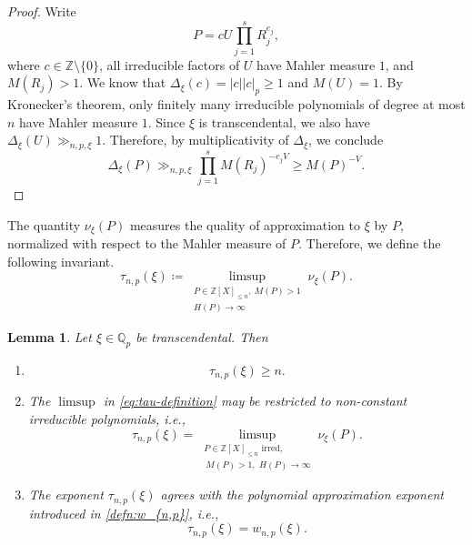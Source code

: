 \documentclass[10pt,a4paper]{amsart}
\newtheorem{lemma}[theorem]{Lemma}
\newcommand{\Z}{\mathbb Z}
\newcommand{\Qp}{\mathbb Q_p}
\begin{document}
\begin{proof}
Write
$$
P=cU\prod_{j=1}^sR_j^{e_j},
$$
where $c\in\Z\setminus\{0\}$, all irreducible factors of $U$ have Mahler
measure $1$, and $M(R_j)>1$. We know that $\Delta_\xi(c)=|c||c|_p\geq1$ and $M(U)=1$. By Kronecker's theorem, only finitely many irreducible polynomials of degree at most $n$ have Mahler measure $1$. Since $\xi$ is transcendental, we also have $\Delta_\xi(U)\gg_{n,p,\xi}1$. Therefore, by multiplicativity of $\Delta_\xi$, we conclude
$$
\Delta_\xi(P)
\gg_{n,p,\xi}\prod_{j=1}^sM(R_j)^{-e_jV}
\geq M(P)^{-V}.
$$
\end{proof}

The quantity $\nu_\xi(P)$ measures the quality of approximation to $\xi$ by $P$, normalized with respect to the Mahler measure of $P$. Therefore, we define the following invariant.
\begin{equation}\label{eq:tau-definition}
\tau_{n,p}(\xi)
\coloneqq
\limsup_{\substack{P\in\Z[X]_{\leq n},\ M(P)>1\\H(P)\to\infty}}
\nu_\xi(P).
\end{equation}
\begin{lemma}\label{lem:dirichlet-quality}
Let $\xi\in\Qp$ be transcendental. Then
\begin{enumerate}[label=\textup{(\roman*)}]
    \item $$
            \tau_{n,p}(\xi)\geq n.
        $$
        \item The $\limsup$ in \eqref{eq:tau-definition} may be restricted to non-constant irreducible polynomials, i.e.,
        \begin{equation}\label{eq:irreducible-extraction}
            \tau_{n,p}(\xi)
                =
                \limsup_{\substack{P\in\Z[X]_{\leq n} \text{ irred},\\\ M(P)>1,\,\,H(P)\to\infty}}
                \nu_\xi(P).
        \end{equation}
        \item The exponent $\tau_{n,p}(\xi)$ agrees with the polynomial approximation
exponent introduced in \eqref{defn:w_{n,p}}, i.e.,
\begin{equation}\label{eq:tau-w}
\tau_{n,p}(\xi)=w_{n,p}(\xi).
\end{equation}
\end{enumerate}

\end{lemma}
\end{document}

